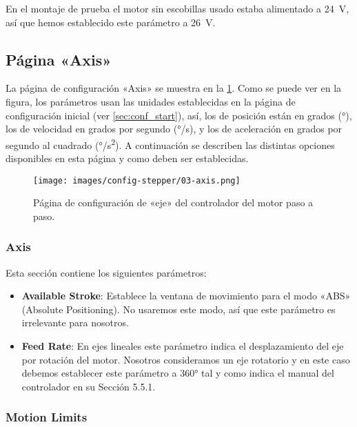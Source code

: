 \documentclass[english,spanish,a4paper,11pt]{article}
\begin{document}
En el montaje de prueba el motor sin escobillas usado estaba alimentado a \qty{24}{\V}, así que hemos establecido este parámetro a \qty{26}{\V}.


\subsection{Página «Axis»}
\label{sec:page_axis}

La página de configuración «Axis» se muestra en la \cref{fig:conf_stepper_3}. Como se puede ver en la figura, los parámetros usan las unidades establecidas en la página de configuración inicial (ver \cref{sec:conf_start}), así, los de posición están en grados (\unit{\degree}), los de velocidad en grados por segundo (\unit{\degree/\s}), y los de aceleración en grados por segundo al cuadrado (\unit{\degree/\s^2}). A continuación se describen las distintas opciones disponibles en esta página y como deben ser establecidas.

\begin{figure}[!ht]
    \centering
    \texttt{[image: images/config-stepper/03-axis.png]}
    \caption{Página de configuración de «eje» del controlador del motor paso a paso.}
    \label{fig:conf_stepper_3}
\end{figure}


\subsubsection{Axis}

Esta sección contiene los siguientes parámetros:

\begin{itemize}
    \item \textbf{Available Stroke}: Establece la ventana de movimiento para el modo «ABS» (Absolute Positioning). No usaremos este modo, así que este parámetro es irrelevante para nosotros.

    \item \textbf{Feed Rate}: En ejes lineales este parámetro indica el desplazamiento del eje por rotación del motor. Nosotros consideramos un eje rotatorio y en este caso debemos establecer este parámetro a \ang{360} tal y como indica el manual del controlador en su Sección 5.5.1.
\end{itemize}


\subsubsection{Motion Limits}
\label{sec:axis_motion_limits}
\end{document}
